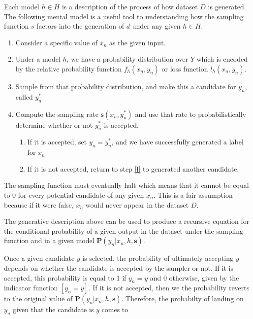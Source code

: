 \documentclass[twoside]{article}
\begin{document}
Each model \(h \in H\) is a description of the process of how dataset \(D\) is generated. The following mental model is a useful tool to understanding how the sampling function \(s\) factors into the generation of \(d\) under any given \(h \in H\).

\begin{enumerate}
	\item Consider a specific value of \(x_n\) as the given input.
	\item Under a model \(h\), we have a probability distribution over \(Y\) which is encoded by the relative probability function \(f_h(x_n,y_n)\) or loss function \(l_h(x_n,y_n)\).
	\item \label{l} Sample from that probability distribution, and make this a candidate for \(y_n\), called \(y_n^*\)
	\item Compute the sampling rate \(\mathbf{s}(x_n,y_n^*)\) and use that rate to probabilistically determine whether or not \(y_n^*\) is accepted.
    \begin{enumerate}
    	  \item If it is accepted, set \(y_n=y_n^*\), and we have successfully generated a label for \(x_n\)
        \item If it is not accepted, return to step \ref{l} to generated another candidate.
    \end{enumerate}
\end{enumerate}

The sampling function must eventually halt which means that it cannot be equal to 0 for every potential candidate of any given \(x_n\). This is a fair assumption because if it were false, \(x_n\) would never appear in the dataset \(D\).

The generative description above can be used to produce a recursive equation for the conditional probability of a given output in the dataset under the sampling function and in a given model \(\mathbf{P}(y_n|x_n,h,\mathbf{s})\).

Once a given candidate \(y\) is selected, the probability of ultimately accepting \(y\) depends on whether the candidate is accepted by the sampler or not. If it is accepted, this probability is equal to 1 if \(y_n = y\) and 0 otherwise, given by the indicator function \(\left [y_n = y\right ]\). If it is not accepted, then we the probability reverts to the original value of \(\mathbf{P}(y_n|x_n,h,\mathbf{s})\). Therefore, the probabilty of landing on \(y_n\) given that the candidate is \(y\) comes to
\end{document}
